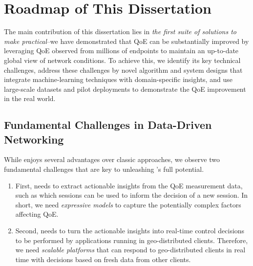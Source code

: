 \section{Roadmap of This Dissertation}

The main contribution of this dissertation lies in {\em the first suite of solutions to make \ddn 
practical}--we have demonstrated that QoE can be substantially improved by
leveraging QoE observed from millions of endpoints to maintain an up-to-date
global view of network conditions.
To achieve this, we identify its key technical challenges, address these 
challenges by novel algorithm and system designs that 
integrate machine-learning techniques with domain-specific  insights,
and use large-scale datasets and pilot 
deployments to demonstrate
the QoE improvement in the real world.

\subsection{Fundamental Challenges in Data-Driven Networking}
While \ddn enjoys several advantages over 
classic approaches, we observe two fundamental challenges 
that are key to unleashing \ddn's full potential.

\begin{enumerate}

\item 
First, \ddn needs to extract actionable insights from the QoE measurement data, 
such as which sessions can be used to inform the decision of a new session.
In short, we need {\em expressive models} to capture the potentially complex 
factors affecting QoE. 

\item 
Second, \ddn needs to turn the actionable insights into 
real-time control decisions to be performed by applications running in
geo-distributed clients. 
Therefore, we need {\em scalable platforms} that can respond to geo-distributed 
clients in real time with decisions based on fresh data from other clients.

\end{enumerate}


